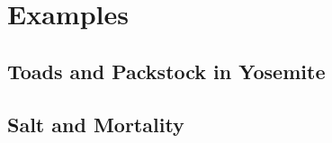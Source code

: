 \documentclass{beamer}
\begin{document}
%
%
%

\section[Examples]{Examples}

\subsection[Toads and Packstock in Yosemite]{Toads and Packstock in Yosemite}


\subsection[Salt and Mortality]{Salt and Mortality}
\end{document}

